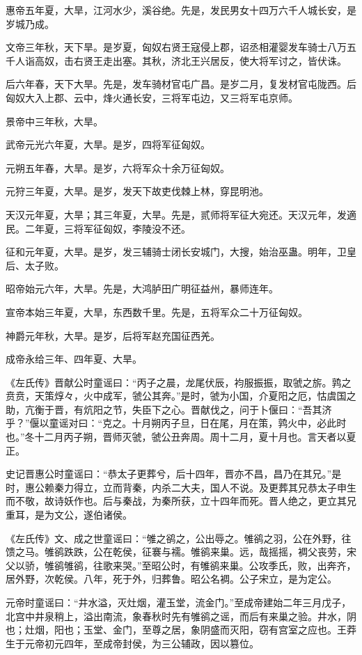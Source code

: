 \documentclass[]{article}
\begin{document}
惠帝五年夏，大旱，江河水少，溪谷绝。先是，发民男女十四万六千人城长安，是岁城乃成。

文帝三年秋，天下旱。是岁夏，匈奴右贤王寇侵上郡，诏丞相灌婴发车骑士八万五千人诣高奴，击右贤王走出塞。其秋，济北王兴居反，使大将军讨之，皆伏诛。

后六年春，天下大旱。先是，发车骑材官屯广昌。是岁二月，复发材官屯陇西。后匈奴大入上郡、云中，烽火通长安，三将军屯边，又三将军屯京师。

景帝中三年秋，大旱。

武帝元光六年夏，大旱。是岁，四将军征匈奴。

元朔五年春，大旱。是岁，六将军众十余万征匈奴。

元狩三年夏，大旱。是岁，发天下故吏伐棘上林，穿昆明池。

天汉元年夏，大旱；其三年夏，大旱。先是，贰师将军征大宛还。天汉元年，发適民。二年夏，三将军征匈奴，李陵没不还。

征和元年夏，大旱。是岁，发三辅骑士闭长安城门，大搜，始治巫蛊。明年，卫皇后、太子败。

昭帝始元六年，大旱。先是，大鸿胪田广明征益州，暴师连年。

宣帝本始三年夏，大旱，东西数千里。先是，五将军众二十万征匈奴。

神爵元年秋，大旱。是岁，后将军赵充国征西羌。

成帝永给三年、四年夏、大旱。

《左氏传》晋献公时童谣曰：``丙子之晨，龙尾伏辰，袀服振振，取虢之旂。鹑之贲贲，天策焞々，火中成军，虢公其奔。''是时，虢为小国，介夏阳之厄，怙虞国之助，亢衡于晋，有炕阳之节，失臣下之心。晋献伐之，问于卜偃曰：``吾其济乎？''偃以童谣对曰：``克之。十月朔丙子旦，日在尾，月在策，鹑火中，必此时也。''冬十二月丙子朔，晋师灭虢，虢公丑奔周。周十二月，夏十月也。言天者以夏正。

史记晋惠公时童谣曰：``恭太子更葬兮，后十四年，晋亦不昌，昌乃在其兄。''是时，惠公赖秦力得立，立而背秦，内杀二大夫，国人不说。及更葬其兄恭太子申生而不敬，故诗妖作也。后与秦战，为秦所获，立十四年而死。晋人绝之，更立其兄重耳，是为文公，遂伯诸侯。

《左氏传》文、成之世童谣曰：``雊之鹆之，公出辱之。雊鹆之羽，公在外野，往馈之马。雊鹆跌跌，公在乾侯，征褰与襦。雊鹆来巢。远，哉摇摇，裯父丧劳，宋父以骄，雊鹆雊鹆，往歌来哭。''至昭公时，有雊鹆来巢。公攻季氏，败，出奔齐，居外野，次乾侯。八年，死于外，归葬鲁。昭公名裯。公子宋立，是为定公。

元帝时童谣曰：``井水溢，灭灶烟，灌玉堂，流金门。''至成帝建始二年三月戊子，北宫中井泉稍上，溢出南流，象春秋时先有雊鹆之谣，而后有来巢之验。井水，阴也；灶烟，阳也；玉堂、金门，至尊之居，象阴盛而灭阳，窃有宫室之应也。王莽生于元帝初元四年，至成帝封侯，为三公辅政，因以篡位。
\end{document}
